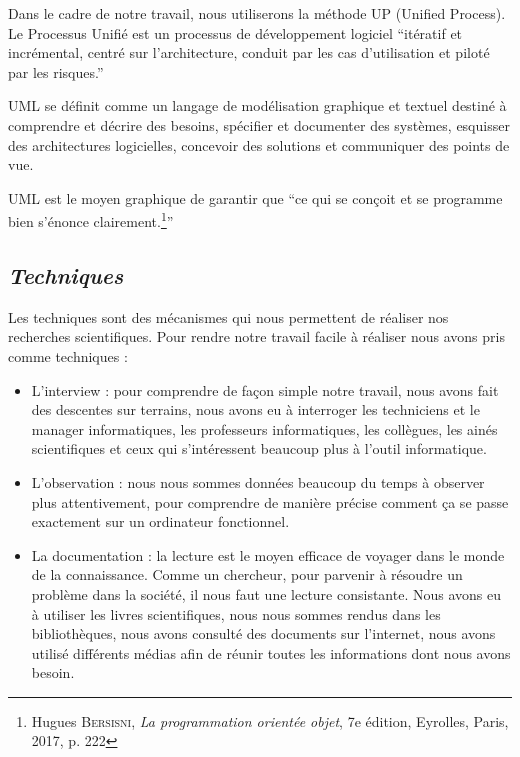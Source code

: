         Dans le cadre de notre travail, nous utiliserons la méthode UP (Unified Process).
        Le Processus Unifié est un processus de développement logiciel \enquote{itératif et incrémental,
        centré sur l’architecture, conduit par les cas d’utilisation et piloté par les risques.} \cite{Roques2008}
        \newline

        UML se définit comme un langage de modélisation graphique et textuel destiné à
        comprendre et décrire des besoins, spécifier et documenter des systèmes, esquisser des
        architectures logicielles, concevoir des solutions et communiquer des points de vue. \cite{RoqVall2007}
        \newline
        
        UML est le moyen graphique de garantir que \enquote{ce qui se conçoit et se programme
        bien s’énonce clairement.\footnote[2]{Hugues \textsc{Bersisni}, \textit{La programmation orientée objet}, 7e édition, Eyrolles, Paris, 2017, p. 222}}
        \subsection[Techniques]{\textit{Techniques}}
        Les techniques sont des mécanismes qui nous permettent de réaliser nos recherches
        scientifiques. Pour rendre notre travail facile à réaliser nous avons pris comme techniques : 
        \newline
        \begin{itemize}
            \item [\ding{226}] L’interview : pour comprendre de façon simple notre travail, nous avons fait des
            descentes sur terrains, nous avons eu à interroger les techniciens et le manager
            informatiques, les professeurs informatiques, les collègues, les ainés scientifiques
            et ceux qui s’intéressent beaucoup plus à l’outil informatique.
            \newline
            \item [\ding{226}] L’observation : nous nous sommes données beaucoup du temps à observer plus
            attentivement, pour comprendre de manière précise comment ça se passe exactement sur un ordinateur fonctionnel.
            \newline
            \item [\ding{226}] La documentation : la lecture est le moyen efficace de voyager dans le monde
            de la connaissance. Comme un chercheur, pour parvenir à résoudre un problème
            dans la société, il nous faut une lecture consistante. Nous avons eu à utiliser les
            livres scientifiques, nous nous sommes rendus dans les bibliothèques, nous avons
            consulté des documents sur l’internet, nous avons utilisé différents médias afin de
            réunir toutes les informations dont nous avons besoin.
        \end{itemize}
